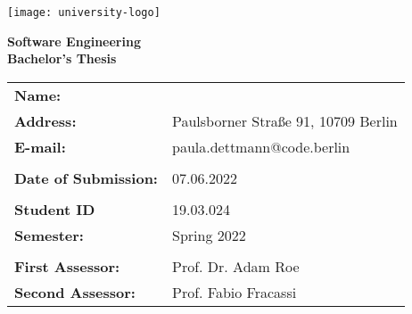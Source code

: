 \begin{titlepage}
	\begin{center}
		\texttt{[image: university-logo]}

		\vspace*{0.8cm}

		\textbf{Software Engineering}\\
		\textbf{Bachelor's Thesis}

		\vfill

		\textbf{\large\thetitle}
	\end{center}

	\vfill

	\noindent\hspace{1mm}\makebox[2in]{\rule{2in}{0.4mm}}
	\vspace{5mm}

	\begin{spacing}{1.1}
		\noindent
		\setlength{\tabcolsep}{20pt}
		\begin{tabular}{@{}ll}
		\textbf{Name:} & \theauthor \\
        \textbf{Address:} & Paulsborner Straße 91, 10709 Berlin \\
        \textbf{E-mail:} & paula.dettmann@code.berlin\\
        \\
        \textbf{Date of Submission:} & 07.06.2022\\
        \\
        \textbf{Student ID} & 19.03.024 \\
		\textbf{Semester:} & Spring 2022\\
		\\
		\textbf{First Assessor:} & Prof. Dr. Adam Roe\\
		\textbf{Second Assessor:} & Prof. Fabio Fracassi\\
		\end{tabular}
	\end{spacing}
\end{titlepage}
